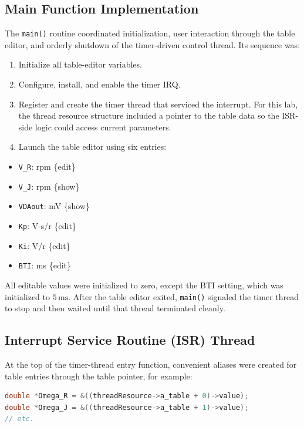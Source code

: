 \documentclass[10pt,twocolumn]{article}
\begin{document}
\subsection{Main Function Implementation}
The \texttt{main()} routine coordinated initialization, user interaction through the table editor, and orderly shutdown of the timer-driven control thread. Its sequence was:
\begin{enumerate}
	\item Initialize all table-editor variables.
	\item Configure, install, and enable the timer IRQ.
	\item Register and create the timer thread that serviced the interrupt. For this lab, the thread resource structure included a pointer to the table data so the ISR-side logic could access current parameters.
	\item Launch the table editor using six entries:
\end{enumerate}

\begin{itemize}
	\item \texttt{V\_R}: rpm \{edit\}
	\item \texttt{V\_J}: rpm \{show\}
	\item \texttt{VDAout}: mV \{show\}
	\item \texttt{Kp}: V-s/r \{edit\}
	\item \texttt{Ki}: V/r \{edit\}
	\item \texttt{BTI}: ms \{edit\}
\end{itemize}

All editable values were initialized to zero, except the BTI setting, which was initialized to $5\,\text{ms}$. After the table editor exited, \texttt{main()} signaled the timer thread to stop and then waited until that thread terminated cleanly.

\subsection{Interrupt Service Routine (ISR) Thread}
At the top of the timer-thread entry function, convenient aliases were created for table entries through the table pointer, for example:

\begin{lstlisting}[language=C]
double *Omega_R = &((threadResource->a_table + 0)->value);
double *Omega_J = &((threadResource->a_table + 1)->value);
// etc.
\end{lstlisting}
\end{document}

